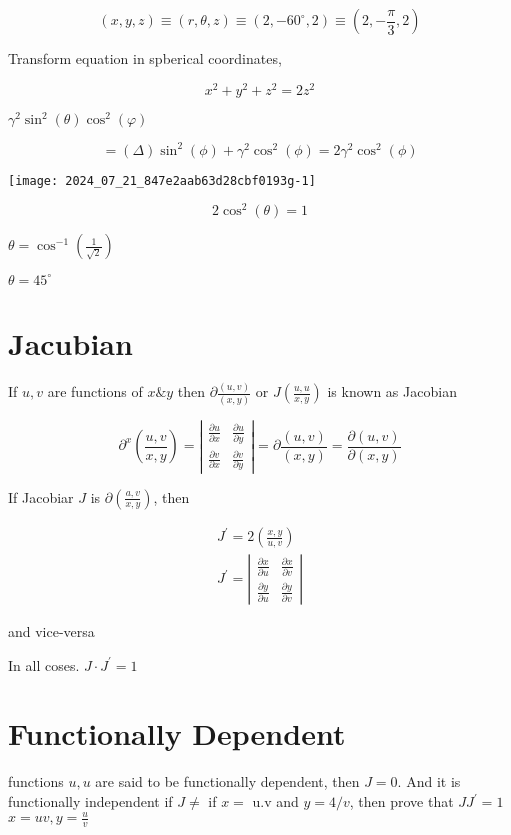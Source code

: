 \documentclass[12pt, a4paper]{article}
\begin{document}
$$
(x, y, z) \equiv(r, \theta, z) \equiv\left(2,-60^{\circ}, 2\right) \equiv\left(2,-\frac{\pi}{3}, 2\right)
$$

Transform equation in spberical coordinates,

$$
x^{2}+y^{2}+z^{2}=2 z^{2}
$$

$\gamma^{2} \sin ^{2}(\theta) \cos ^{2}(\varphi)$

$$
=(\Delta) \sin ^{2}(\phi)+\gamma^{2} \cos ^{2}(\phi)=2 \gamma^{2} \cos ^{2}(\phi)
$$

\begin{center}
\texttt{[image: 2024\_07\_21\_847e2aab63d28cbf0193g-1]}
\end{center}

$$
2 \cos ^{2}(\theta)=1
$$

$\theta=\cos ^{-1}\left(\frac{1}{\sqrt{2}}\right)$

$\theta=45^{\circ}$

\section*{Jacubian}
If $u, v$ are functions of $x \& y$ then $\partial \frac{(u, v)}{(x, y)}$ or $J\left(\frac{u, u}{x, y}\right)$ is known as Jacobian

$$
\partial^{x}\left(\frac{u, v}{x, y}\right)=\left|\begin{array}{ll}
\frac{\partial u}{\partial x} & \frac{\partial u}{\partial y} \\
\frac{\partial v}{\partial x} & \frac{\partial v}{\partial y}
\end{array}\right|=\partial \frac{(u, v)}{(x, y)}=\frac{\partial(u, v)}{\partial(x, y)}
$$

If Jacobiar $J$ is $\partial\left(\frac{a, v}{x, y}\right)$, then

$$
\begin{array}{r}
J^{\prime}=2\left(\frac{x, y}{u, v}\right) \\
J^{\prime}=\left|\begin{array}{ll}
\frac{\partial x}{\partial u} & \frac{\partial x}{\partial v} \\
\frac{\partial y}{\partial u} & \frac{\partial y}{\partial v}
\end{array}\right|
\end{array}
$$

and vice-versa

In all coses. $J \cdot J^{\prime}=1$

\section*{Functionally Dependent}
functions $u, u$ are said to be functionally dependent, then $J=0$. And it is functionally independent if $J \neq$ if $x=$ u.v and $y=4 / v$, then prove that $J J^{\prime}=1$ $x=u v, y=\frac{u}{v}$
\end{document}
